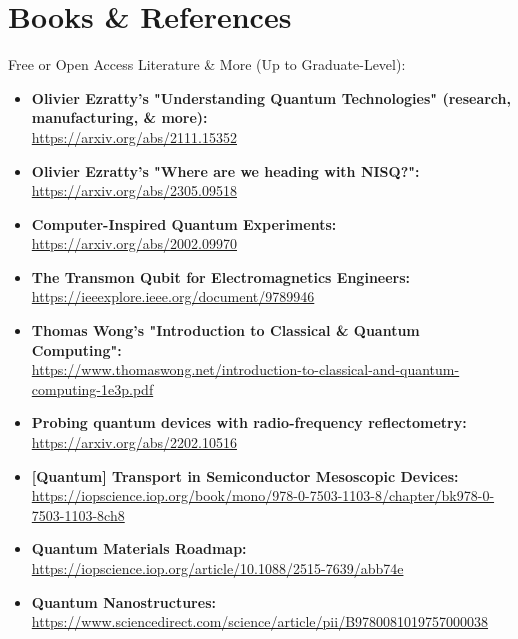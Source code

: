 \chapter{\LARGE Books \& References}

\large\begin{flushleft} Free or Open Access Literature \& More (Up to Graduate-Level):
\end{flushleft}

\normalsize\begin{itemize}

  \item\textbf{Olivier Ezratty's "Understanding Quantum Technologies" (research, manufacturing, \& more):}\\
\url{https://arxiv.org/abs/2111.15352}

  \item\textbf{Olivier Ezratty's "Where are we heading with NISQ?":}\\
\url{https://arxiv.org/abs/2305.09518}

  \item\textbf{Computer-Inspired Quantum Experiments:}\\
\url{https://arxiv.org/abs/2002.09970}

  \item\textbf{The Transmon Qubit for Electromagnetics Engineers:}\\
\url{https://ieeexplore.ieee.org/document/9789946}

  \item\textbf{Thomas Wong's "Introduction to Classical \& Quantum Computing":}\\
\url{https://www.thomaswong.net/introduction-to-classical-and-quantum-computing-1e3p.pdf}

  \item\textbf{Probing quantum devices with radio-frequency reflectometry:}\\
\url{https://arxiv.org/abs/2202.10516}

  \item\textbf{[Quantum] Transport in Semiconductor Mesoscopic Devices:}\\
\url{https://iopscience.iop.org/book/mono/978-0-7503-1103-8/chapter/bk978-0-7503-1103-8ch8}

  \item\textbf{Quantum Materials Roadmap:}\\
\url{https://iopscience.iop.org/article/10.1088/2515-7639/abb74e}

  \item\textbf{Quantum Nanostructures:}\\
\url{https://www.sciencedirect.com/science/article/pii/B9780081019757000038}


\end{itemize}
